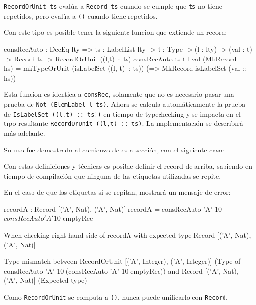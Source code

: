 \texttt{RecordOrUnit ts} evalúa a \texttt{Record ts} cuando se cumple que \texttt{ts} no tiene repetidos, pero evalúa a \texttt{()} cuando tiene repetidos.

Con este tipo es posible tener la siguiente funcion que extiende un record:

\begin{code}
consRecAuto : DecEq lty => {ts : LabelList lty} -> 
  {t : Type} -> (l : lty) -> (val : t) -> Record ts -> 
  RecordOrUnit ((l,t) :: ts)
consRecAuto {ts} {t} l val (MkRecord _ hs) = 
  mkTypeOrUnit (isLabelSet ((l, t) :: ts)) 
  (\isLabelSet => MkRecord isLabelSet (val :: hs))
\end{code}

Esta funcion es identica a \texttt{consRec}, solamente que no es necesario pasar una prueba de \texttt{Not (ElemLabel l ts)}. Ahora se calcula automáticamente la prueba de \texttt{IsLabelSet ((l,t) :: ts))}  en tiempo de typechecking y se impacta en el tipo resultante \texttt{RecordOrUnit ((l,t) :: ts)}. La implementación se describirá más adelante.

Su uso fue demostrado al comienzo de esta sección, con el siguiente caso:


Con estas definiciones y técnicas es posible definir el record de arriba, sabiendo en tiempo de compilación que ninguna de las etiquetas utilizadas se repite.

En el caso de que las etiquetas si se repitan, mostrará un mensaje de error:

\begin{code}
recordA : Record [('A', Nat), ('A', Nat)]
recordA = consRecAuto 'A' 10 $ consRecAuto 'A' 10 $ emptyRec

When checking right hand side of recordA with expected type
             Record [('A', Nat), ('A', Nat)]
     
     Type mismatch between
             RecordOrUnit [('A', Integer), ('A', Integer)] 
               (Type of consRecAuto 'A' 10
                 (consRecAuto 'A' 10 emptyRec))
     and
             Record [('A', Nat), ('A', Nat)] (Expected type)
\end{code}

Como \texttt{RecordOrUnit} se computa a \texttt{()}, nunca puede unificarlo con \texttt{Record}.

